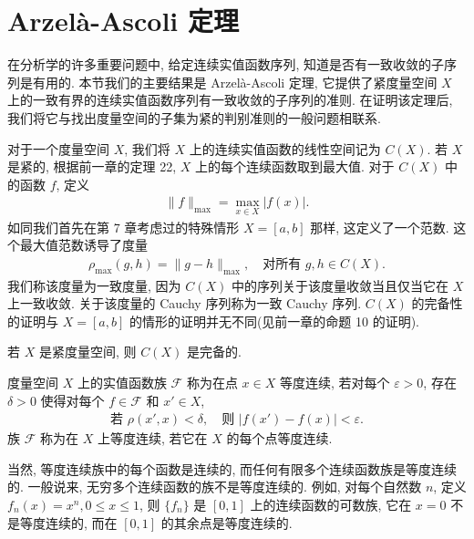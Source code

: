 \documentclass[../../main.tex]{subfiles}
\begin{document}
\section{Arzel\`a-Ascoli 定理}\label{section:ch10-arzela-ascoli}

在分析学的许多重要问题中, 给定连续实值函数序列, 知道是否有一致收敛的子序列是有用的. 本节我们的主要结果是 Arzel\`a-Ascoli 定理, 它提供了紧度量空间 $X$ 上的一致有界的连续实值函数序列有一致收敛的子序列的准则. 在证明该定理后, 我们将它与找出度量空间的子集为紧的判别准则的一般问题相联系.

对于一个度量空间 $X$, 我们将 $X$ 上的连续实值函数的线性空间记为 $C(X)$. 若 $X$ 是紧的, 根据前一章的定理 22, $X$ 上的每个连续函数取到最大值. 对于 $C(X)$ 中的函数 $f$, 定义
\begin{align*}
\|f\|_{\max}=\max_{x\in X}|f(x)|.
\end{align*}
如同我们首先在第 7 章考虑过的特殊情形 $X=[a,b]$ 那样, 这定义了一个范数. 这个最大值范数诱导了度量
\begin{align*}
\rho_{\max}(g,h)=\|g-h\|_{\max},\quad\text{对所有 }g,h\in C(X).
\end{align*}
我们称该度量为一致度量, 因为 $C(X)$ 中的序列关于该度量收敛当且仅当它在 $X$ 上一致收敛. 关于该度量的 Cauchy 序列称为一致 Cauchy 序列. $C(X)$ 的完备性的证明与 $X=[a,b]$ 的情形的证明并无不同(见前一章的命题 10 的证明).

\begin{proposition}\label{proposition:ch10-CX完备}
若 $X$ 是紧度量空间, 则 $C(X)$ 是完备的.
\end{proposition}

\begin{definition}[等度连续]\label{definition:ch10-等度连续}
度量空间 $X$ 上的实值函数族 $\mathcal{F}$ 称为在点 $x\in X$ 等度连续, 若对每个 $\varepsilon>0$, 存在 $\delta>0$ 使得对每个 $f\in\mathcal{F}$ 和 $x'\in X$,
\begin{align*}
\text{若 }\rho(x',x)<\delta,\quad\text{则 }|f(x')-f(x)|<\varepsilon.
\end{align*}
族 $\mathcal{F}$ 称为在 $X$ 上等度连续, 若它在 $X$ 的每个点等度连续.
\end{definition}

当然, 等度连续族中的每个函数是连续的, 而任何有限多个连续函数族是等度连续的. 一般说来, 无穷多个连续函数的族不是等度连续的. 例如, 对每个自然数 $n$, 定义 $f_{n}(x)=x^{n}, 0\leqslant x\leqslant 1$, 则 $\{f_{n}\}$ 是 $[0,1]$ 上的连续函数的可数族, 它在 $x=0$ 不是等度连续的, 而在 $[0,1]$ 的其余点是等度连续的.
\end{document}
